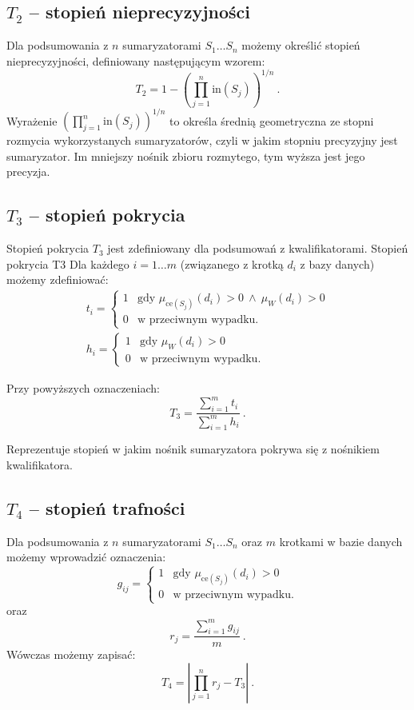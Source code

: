 \documentclass{classrep}
\begin{document}
\subsection{\(T_2\) -- stopień nieprecyzyjności}
Dla podsumowania z \(n\) sumaryzatorami \(S_1 \ldots S_n\) możemy określić stopień nieprecyzyjności,
definiowany następującym wzorem:
\[T_2 = 1 - \left(\prod_{j=1}^{n} \mathrm{in}(S_j)\right)^{1/n} ~\mbox{.}\]
Wyrażenie \(\left(\prod_{j=1}^{n} \mathrm{in}(S_j)\right)^{1/n}\) to określa średnią geometryczna ze stopni rozmycia wykorzystanych sumaryzatorów, czyli w jakim stopniu precyzyjny jest sumaryzator. Im mniejszy nośnik zbioru rozmytego, tym wyższa jest jego precyzja.
   

\subsection{\(T_3\) -- stopień pokrycia}
Stopień pokrycia \(T_3\) jest zdefiniowany dla podsumowań z kwalifikatorami. Stopień pokrycia T3 
Dla każdego \(i=1\ldots m\) (związanego z krotką \(d_i\) z bazy
danych) możemy zdefiniować:
\[
\begin{array}{l}
t_i = \begin{cases}
1 & \mbox{gdy } \mu_{\mathrm{ce}(S_j)}(d_i) > 0 ~ \wedge ~ \mu_{W}(d_i) > 0 \\
0 & \mbox{w przeciwnym wypadku.}
\end{cases} \\
h_i = \begin{cases}
1 & \mbox{gdy } \mu_{W}(d_i) > 0 \\
0 & \mbox{w przeciwnym wypadku.}
\end{cases}
\end{array}\]

Przy powyższych oznaczeniach:
\[T_3 = \frac{\sum_{i=1}^{m} t_i}{\sum_{i=1}^{m} h_i} ~\mbox{.}\]

Reprezentuje stopień w jakim nośnik sumaryzatora pokrywa się z nośnikiem kwalifikatora.


\subsection{\(T_4\) -- stopień trafności}
Dla podsumowania z \(n\) sumaryzatorami \(S_1 \ldots S_n\)
oraz \(m\) krotkami w bazie danych możemy wprowadzić oznaczenia:
\[g_{ij} = \begin{cases}
1 & \mbox{gdy } \mu_{\mathrm{ce}(S_j)}(d_i) > 0 \\
0 & \mbox{w przeciwnym wypadku.}
\end{cases}\]
oraz
\[r_j = \frac{\sum_{i=1}^{m} g_{ij}}{m} ~\mbox{.}\]
Wówczas możemy zapisać:
\[T_4 = \left| \prod_{j=1}^{n} r_j - T_3\right| ~\mbox{.}\]
\end{document}
